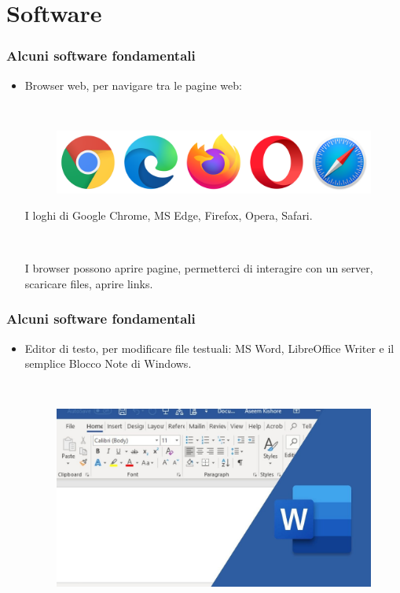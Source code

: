 \documentclass[handout]{beamer}
\begin{document}
\section{Software}


\begin{frame}
\frametitle{Alcuni software fondamentali}
\begin{itemize}
  \item Browser web, per navigare tra le pagine web:
  
  ~

    \begin{figure}
      \includegraphics[width=.9\columnwidth]{img/browsers.png}
    \end{figure}
    I loghi di Google Chrome, MS Edge, Firefox, Opera, Safari.\pause

    ~
    
  I browser possono aprire pagine, permetterci di interagire con un server, scaricare files, aprire links.
\end{itemize}
\end{frame}

\begin{frame}
\frametitle{Alcuni software fondamentali}
\begin{itemize}
  \item Editor di testo, per modificare file testuali: MS Word, LibreOffice Writer e il semplice Blocco Note di Windows.
  
  ~

  \begin{figure}
    \includegraphics[width=.9\columnwidth]{img/word.jpg}
  \end{figure}
\end{itemize}
\end{frame}
\end{document}
